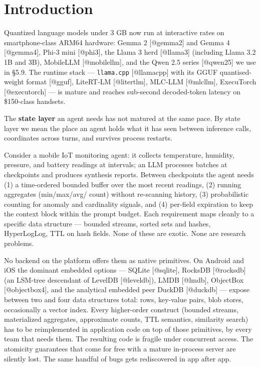 \section{Introduction}\label{introduction}

Quantized language models under 3 GB now run at interactive rates on
smartphone-class ARM64 hardware: Gemma 2 {[}@gemma2{]} and Gemma 4
{[}@gemma4{]}, Phi-3 mini {[}@phi3{]}, the Llama 3 herd {[}@llama3{]} (including
Llama 3.2 1B and 3B), MobileLLM {[}@mobilellm{]}, and the Qwen 2.5 series
{[}@qwen25{]} we use in §5.9. The runtime stack --- \texttt{llama.cpp}
{[}@llamacpp{]} with its GGUF quantised-weight format {[}@gguf{]}, LiteRT-LM
{[}@litertlm{]}, MLC-LLM {[}@mlcllm{]}, ExecuTorch {[}@executorch{]} --- is
mature and reaches sub-second decoded-token latency on \$150-class handsets.

The \textbf{state layer} an agent needs has not matured at the same pace. By
state layer we mean the place an agent holds what it has seen between inference
calls, coordinates across turns, and survives process restarts.

Consider a mobile IoT monitoring agent: it collects temperature, humidity,
pressure, and battery readings at intervals; an LLM processes batches at
checkpoints and produces synthesis reports. Between checkpoints the agent needs
(1) a time-ordered bounded buffer over the most recent readings, (2) running
aggregates (min/max/avg/ count) without re-scanning history, (3) probabilistic
counting for anomaly and cardinality signals, and (4) per-field expiration to
keep the context block within the prompt budget. Each requirement maps cleanly
to a specific data structure --- bounded streams, sorted sets and hashes,
HyperLogLog, TTL on hash fields. None of these are exotic. None are research
problems.

No backend on the platform offers them as native primitives. On Android and iOS
the dominant embedded options --- SQLite {[}@sqlite{]}, RocksDB {[}@rocksdb{]}
(an LSM-tree descendant of LevelDB {[}@leveldb{]}), LMDB {[}@lmdb{]}, ObjectBox
{[}@objectbox4{]}, and the analytical embedded peer DuckDB {[}@duckdb{]} ---
expose between two and four data structures total: rows, key-value pairs, blob
stores, occasionally a vector index. Every higher-order construct (bounded
streams, materialized aggregates, approximate counts, TTL semantics, similarity
search) has to be reimplemented in application code on top of those primitives,
by every team that needs them. The resulting code is fragile under concurrent
access. The atomicity guarantees that come for free with a mature in-process
server are silently lost. The same handful of bugs gets rediscovered in app
after app.

